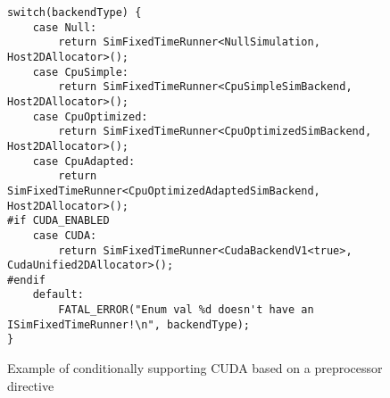 \begin{figure}[ht]
    \centering
    \lstset{
 language=c++
}
\lstset{linewidth=1.15\linewidth,xleftmargin=-.075\linewidth}
\begin{lstlisting}
switch(backendType) {
    case Null:
        return SimFixedTimeRunner<NullSimulation, Host2DAllocator>();
    case CpuSimple:
        return SimFixedTimeRunner<CpuSimpleSimBackend, Host2DAllocator>();
    case CpuOptimized:
        return SimFixedTimeRunner<CpuOptimizedSimBackend, Host2DAllocator>();
    case CpuAdapted:
        return SimFixedTimeRunner<CpuOptimizedAdaptedSimBackend, Host2DAllocator>();
#if CUDA_ENABLED
    case CUDA:
        return SimFixedTimeRunner<CudaBackendV1<true>, CudaUnified2DAllocator>();
#endif
    default:
        FATAL_ERROR("Enum val %d doesn't have an ISimFixedTimeRunner!\n", backendType);
}\end{lstlisting}
    \caption{Example of conditionally supporting CUDA based on a preprocessor directive}
    \label{fig:ConditionalCUDA}
\end{figure}